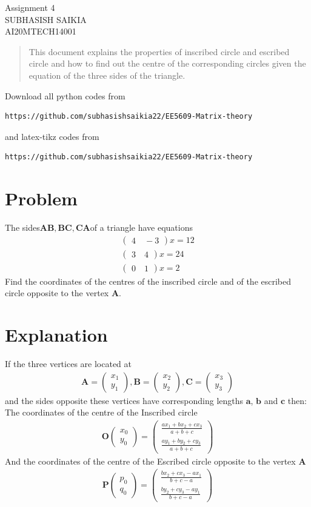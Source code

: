 \documentclass[journal,12pt,twocolumn]{IEEEtran}
\newcommand{\myvec}[1]{\ensuremath{\begin{pmatrix}#1\end{pmatrix}}}
\numberwithin{equation}{subsection}
\let\vec\mathbf
\begin{document}
\begin{center}
\huge Assignment 4\\
\large SUBHASISH SAIKIA\\
\large AI20MTECH14001\\
\end{center}
\vspace{0.5cm}
\begin{abstract}
This document explains the properties of inscribed circle and  escribed circle and how to find out the centre of the corresponding circles given the equation of the three sides of the triangle. 
\end{abstract}
\vspace{0.5cm}
Download all python codes from 
\begin{lstlisting}
https://github.com/subhasishsaikia22/EE5609-Matrix-theory
\end{lstlisting}
%
and latex-tikz codes from 
\begin{lstlisting}
https://github.com/subhasishsaikia22/EE5609-Matrix-theory
\end{lstlisting}
%
\vspace{0.5cm}
\section{Problem}
The sides$ \vec{AB},\vec{BC}, \vec{CA} $of a triangle have equations
\begin{align}
    \myvec{4\quad-3}x=12\\
    \myvec{3\quad4}x=24 \\ 
    \myvec{0\quad1}x=2
\end{align} 
Find the coordinates of the centres of the
inscribed circle and of the escribed circle opposite
to the vertex $\vec{A}$.

\section{Explanation}

If the three vertices are located at\begin{align}
     \vec{A}=\myvec{x_1 \\y_1},
     \vec{B}= \myvec{x_2 \\y_2},
     \vec{C}=\myvec{x_3\\y_3}
\end{align} 
and the sides opposite these vertices have corresponding lengths $\vec{a}$, $\vec{b}$ and $\vec{c}$ then:\\
 The coordinates of the centre of the Inscribed circle
 \begin{align}
 \vec{O}\myvec{x_0 \\y_0}=\myvec{\frac{ax_1+ bx_2+cx_3}{a+b+c}\\ \frac{ay_1+by_2+cy_3}{a+b+c}}
 \end{align} 
And the coordinates of the centre of the Escribed circle  opposite to the vertex $\vec{A}$
 \begin{align}
\vec{P}\myvec{p_0 \\q_0}=\myvec{\frac{ bx_2+cx_3-ax_1}{b+c-a}\\ \frac{by_2+cy_3-ay_1}{b+c-a}}
 \end{align}
 
\end{document}

